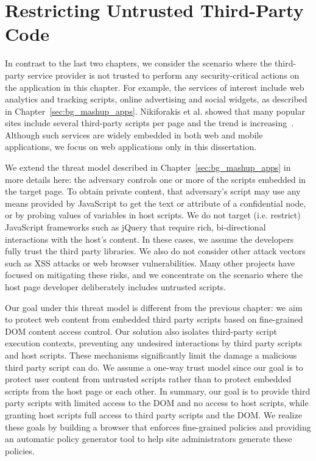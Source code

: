 \chapter{Restricting Untrusted Third-Party Code}
\label{sec:esorics}

In contrast to the last two chapters, we consider the scenario where the third-party service provider is not trusted to perform any security-critical actions on the application in this chapter.  For example, the services of interest include web analytics and tracking scripts, online advertising and social widgets, as described in Chapter~\ref{sec:bg_mashup_apps}.  Nikiforakis et al. showed that many popular sites include several third-party scripts per page and the trend is increasing~\cite{Nikiforakis:2012:YYI:2382196.2382274}.  Although such services are widely embedded in both web and mobile applications, we focus on web applications only in this dissertation.  

  We extend the threat model described in Chapter~\ref{sec:bg_mashup_apps} in more details here: the adversary controls one or more of the scripts embedded in the target page.  To obtain private content, that adversary's script may use any means provided by JavaScript to get the text or attribute of a confidential node, or by probing values of variables in host scripts.  We do not target (i.e. restrict) JavaScript frameworks such as jQuery that require rich, bi-direct\-ion\-al interactions with the host's content.  In these cases, we assume the developers fully trust the third party libraries.  We also do not consider other attack vectors such as XSS attacks or web browser vulnerabilities.  Many other projects have focused on mitigating these risks, and we concentrate on the scenario where the host page developer deliberately includes untrusted scripts.

Our goal under this threat model is different from the previous chapter: we aim to protect web content from embedded third party scripts based on fine-grained DOM content access control.  Our solution also isolates third-party script execution contexts, preventing any undesired interactions by third party scripts and host scripts.  These mechanisms significantly limit the damage a malicious third party script can do.  We assume a one-way trust model since our goal is to protect user content from untrusted scripts rather than to protect embedded scripts from the host page or each other.  In summary, our goal is to provide third party scripts with limited access to the DOM and no access to host scripts, while granting host scripts full access to third party scripts and the DOM.  We realize these goals by building a browser that enforces fine-grained policies and providing an automatic policy generator tool to help site administrators generate these policies.  

